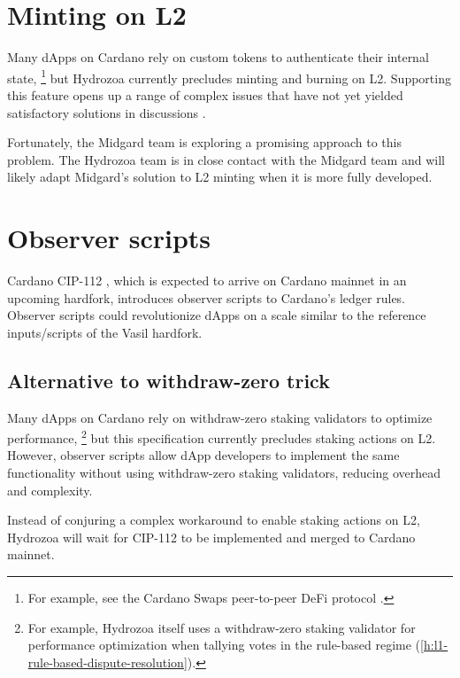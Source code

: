 \documentclass[../hydrozoa.tex]{subfiles}
\begin{document}
\section{Minting on L2}%
\label{h:future-work-minting}%

Many dApps on Cardano rely on custom tokens to authenticate their internal state,%
\footnote{For example, see the Cardano Swaps peer-to-peer DeFi protocol \citep{fallen-icarusCardanoSwapsP2P2025}.}
  but Hydrozoa currently precludes minting and burning on L2.
Supporting this feature opens up a range of complex issues that have not yet yielded satisfactory solutions in discussions \citep{IOGExcludePhantomTokens2025}.

Fortunately, the Midgard team is exploring a promising approach to this problem.
The Hydrozoa team is in close contact with the Midgard team and will likely adapt Midgard's solution to L2 minting when it is more fully developed.

\section{Observer scripts}%
\label{h:future-work-observer-scripts}%

Cardano CIP-112 \citep{DiSarroCIP112ObserveScript2024}, which is expected to arrive on Cardano mainnet in an upcoming hardfork, introduces observer scripts to Cardano's ledger rules.
Observer scripts could revolutionize dApps on a scale similar to the reference inputs/scripts of the Vasil hardfork.

\subsection{Alternative to withdraw-zero trick}%
\label{h:observer-script-withdraw-zero-trick}%

Many dApps on Cardano rely on withdraw-zero staking validators to optimize performance,%
\footnote{For example, Hydrozoa itself uses a withdraw-zero staking validator for performance optimization when tallying votes in the rule-based regime (\cref{h:l1-rule-based-dispute-resolution}).}
but this specification currently precludes staking actions on L2.
However, observer scripts allow dApp developers to implement the same functionality without using withdraw-zero staking validators, reducing overhead and complexity.

Instead of conjuring a complex workaround to enable staking actions on L2, Hydrozoa will wait for CIP-112 to be implemented and merged to Cardano mainnet.
\end{document}
